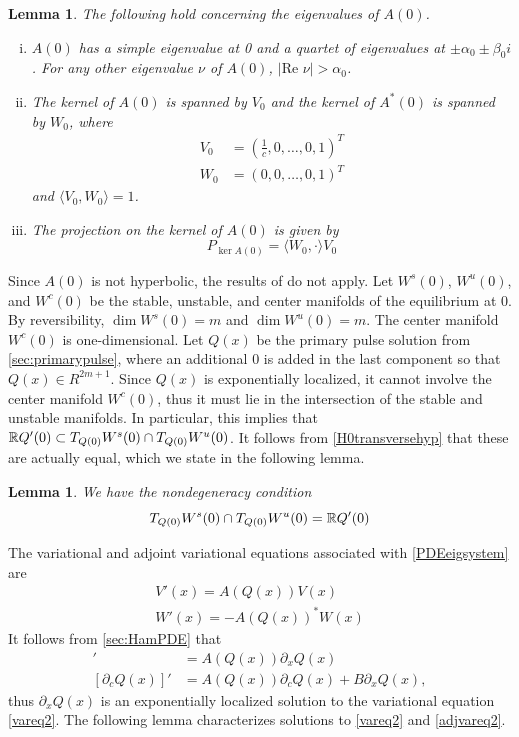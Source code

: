 \documentclass[11pt,reqno]{amsart}
\theoremstyle{plain}
\newtheorem{lemma}[theorem]{Lemma}
\theoremstyle{definition}
\theoremstyle{remark}
\begin{document}
\begin{lemma}\label{eigA0lemma}
The following hold concerning the eigenvalues of $A(0)$.
\begin{enumerate}[(i)]
\item $A(0)$ has a simple eigenvalue at 0 and a quartet of eigenvalues at $\pm \alpha_0 \pm \beta_0 i$. For any other eigenvalue $\nu$ of $A(0)$, $|\text{Re }\nu| > \alpha_0$.
\item The kernel of $A(0)$ is spanned by $V_0$ and the kernel of $A^*(0)$ is spanned by $W_0$, where
\begin{align}
V_0 &= \left(\frac{1}{c}, 0, \dots, 0, 1\right)^T \label{V0} \\
W_0 &= (0, 0, \dots, 0, 1)^T \label{W0}
\end{align}
and $\langle V_0, W_0 \rangle = 1$.
\item The projection on the kernel of $A(0)$ is given by
\begin{equation}\label{projkernelA0}
P_{\ker A(0)} = \langle W_0, \cdot \rangle V_0
\end{equation}
\end{enumerate} 
\end{lemma}

Since $A(0)$ is not hyperbolic, the results of \cite{Sandstede1998} do not apply. Let $W^s(0)$, $W^u(0)$, and $W^c(0)$ be the stable, unstable, and center manifolds of the equilibrium at 0. By reversibility, $\dim W^s(0) = m$ and $\dim W^u(0) = m$. The center manifold $W^c(0)$ is one-dimensional. Let $Q(x)$ be the primary pulse solution from \cref{sec:primarypulse}, where an additional 0 is added in the last component so that $Q(x) \in R^{2m+1}$. Since $Q(x)$ is exponentially localized, it cannot involve the center manifold $W^c(0)$, thus it must lie in the intersection of the stable and unstable manifolds. In particular, this implies that $\mathbb{R} Q'(0) \subset T_{Q(0)}W^s(0) \cap T_{Q(0)}W^u(0)$. It follows from \cref{H0transversehyp} that these are actually equal, which we state in the following lemma.

\begin{lemma}\label{nondegenlemma}
We have the nondegeneracy condition
\begin{equation}\label{nondegen2}
T_{Q(0)}W^s(0) \cap T_{Q(0)}W^u(0) = \mathbb{R} Q'(0)
\end{equation}
\end{lemma}

The variational and adjoint variational equations associated with \cref{PDEeigsystem} are
\begin{align}
V'(x) = A(Q(x)) V(x) \label{vareq2} \\
W'(x) = -A(Q(x))^* W(x) \label{adjvareq2}
\end{align}
It follows from \cref{sec:HamPDE} that 
\begin{align}
[\partial_x Q(x)]' &= A(Q(x))\partial_x Q(x) \label{Qprimevarsol} \\
[\partial_c Q(x)]' &= A(Q(x))\partial_c Q(x) + B \partial_x Q(x), \label{Qcvarsol}
\end{align}
thus $\partial_x Q(x)$ is an exponentially localized solution to the variational equation \eqref{vareq2}. The following lemma characterizes solutions to \eqref{vareq2} and \eqref{adjvareq2}.
\end{document}
